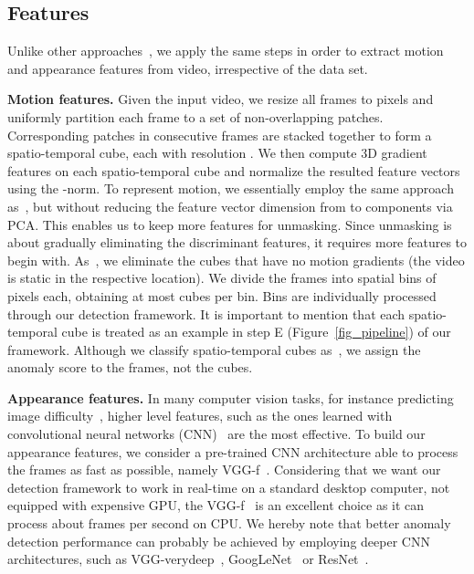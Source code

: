 \documentclass[10pt,twocolumn,letterpaper]{article}
\begin{document}
\subsection{Features}
\label{sec_Features}

Unlike other approaches~\cite{Cheng-CVPR-2015,Xu-BMVC-2015}, we apply the same steps in order to extract motion and appearance features from video, irrespective of the data set.

\noindent
{\bf Motion features.}
Given the input video, we resize all frames to  pixels and uniformly partition each frame to a set of non-overlapping  patches. Corresponding patches in  consecutive frames are stacked together to form a spatio-temporal cube, each with resolution . We then compute 3D gradient features on each spatio-temporal cube and normalize the resulted feature vectors using the -norm. To represent motion, we essentially employ the same approach as~\cite{Giorno-ECCV-2016,Lu-ICCV-2013}, but without reducing the feature vector dimension from  to  components via PCA. This enables us to keep more features for unmasking. Since unmasking is about gradually eliminating the discriminant features, it requires more features to begin with. As~\cite{Giorno-ECCV-2016,Lu-ICCV-2013}, we eliminate the cubes that have no motion gradients (the video is static in the respective location). We divide the frames into  spatial bins of  pixels each, obtaining at most  cubes per bin. Bins are individually processed through our detection framework. It is important to mention that each spatio-temporal cube is treated as an example in step E (Figure~\ref{fig_pipeline}) of our framework. Although we classify spatio-temporal cubes as~\cite{Giorno-ECCV-2016}, we assign the anomaly score to the frames, not the cubes.

\noindent
{\bf Appearance features.}
In many computer vision tasks, for instance predicting image difficulty~\cite{img-difficulty-CVPR-2016}, higher level features, such as the ones learned with convolutional neural networks (CNN)~\cite{Hinton-NIPS-2012} are the most effective. To build our appearance features, we consider a pre-trained CNN architecture able to process the frames as fast as possible, namely VGG-f~\cite{Chatfield-BMVC-14}. Considering that we want our detection framework to work in real-time on a standard desktop computer, not equipped with expensive GPU, the VGG-f~\cite{Chatfield-BMVC-14} is an excellent choice as it can process about  frames per second on CPU. We hereby note that better anomaly detection performance can probably be achieved by employing deeper CNN architectures, such as VGG-verydeep~\cite{Simonyan-ICLR-14}, GoogLeNet~\cite{Szegedy-CVPR-2015} or ResNet~\cite{He-CVPR-2016}.
\end{document}
